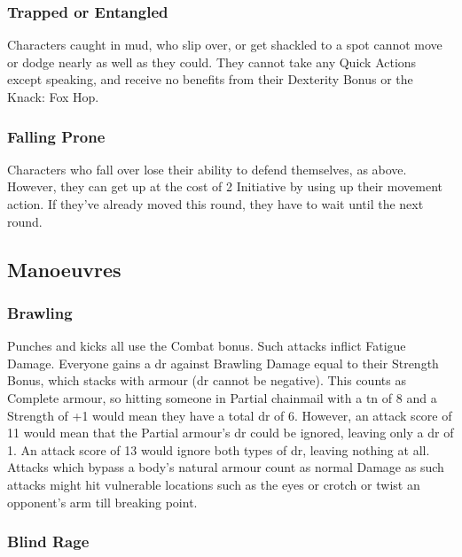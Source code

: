 \begin{multicols}{2}
\subsubsection{Trapped or Entangled}

Characters caught in mud, who slip over, or get shackled to a spot cannot move or dodge nearly as well as they could.
They cannot take any Quick Actions except speaking, and receive no benefits from their Dexterity Bonus or the Knack: Fox Hop.

\subsubsection{Falling Prone}\label{prone}

Characters who fall over lose their ability to defend themselves, as above.  However, they can get up at the cost of 2 Initiative by using up their movement action.  If they've already moved this \gls{round}, they have to wait until the next \gls{round}.

\subsection{Manoeuvres}

\subsubsection{Brawling}

Punches and kicks all use the Combat bonus. Such attacks inflict Fatigue Damage. Everyone gains a \gls{dr} against Brawling Damage equal to their Strength Bonus, which stacks with armour (\gls{dr} cannot be negative). This counts as Complete armour, so hitting someone in Partial chainmail with a \gls{tn} of 8 and a Strength of +1 would mean they have a total \gls{dr} of 6. However, an attack score of 11 would mean that the Partial armour's \gls{dr} could be ignored, leaving only a \gls{dr} of 1. An attack score of 13 would ignore both types of \gls{dr}, leaving nothing at all. Attacks which bypass a body's natural armour count as normal Damage as such attacks might hit vulnerable locations such as the eyes or crotch or twist an opponent's arm till breaking point.

\subsubsection{Blind Rage}\label{blind}


\end{multicols}
